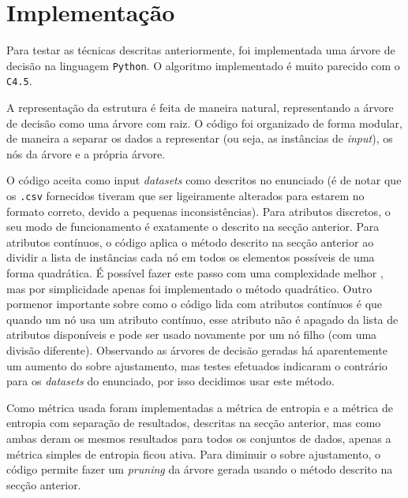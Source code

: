 \documentclass[12pt,a4paper,oneside]{article}
\begin{document}

\section{Implementação}
\label{sec:imp}

Para testar as técnicas descritas anteriormente, foi implementada uma
árvore de decisão na linguagem \texttt{Python}. O algoritmo
implementado é muito parecido com o \texttt{C4.5}.

A representação da estrutura é feita de maneira natural, representando
a árvore de decisão como uma árvore com raiz. O código foi organizado
de forma modular, de maneira a separar os dados a representar (ou
seja, as instâncias de \textit{input}), os nós da árvore e a própria
árvore.

O código aceita como input \textit{datasets} como descritos no
enunciado (é de notar que os \texttt{.csv} fornecidos tiveram que ser
ligeiramente alterados para estarem no formato correto, devido a
pequenas inconsistências). Para atributos discretos, o seu modo de
funcionamento é exatamente o descrito na secção anterior. Para
atributos contínuos, o código aplica o método descrito na secção
anterior ao dividir a lista de instâncias cada nó em todos os
elementos possíveis de uma forma quadrática. É possível fazer este
passo com uma complexidade melhor \cite{quinlan:1996}, mas por
simplicidade apenas foi implementado o método quadrático. Outro
pormenor importante sobre como o código lida com atributos contínuos é
que quando um nó usa um atributo contínuo, esse atributo não é apagado
da lista de atributos disponíveis e pode ser usado novamente por um nó
filho (com uma divisão diferente). Observando as árvores de decisão
geradas há aparentemente um aumento do sobre ajustamento, mas testes
efetuados indicaram o contrário para os \textit{datasets} do
enunciado, por isso decidimos usar este método.

Como métrica usada foram implementadas a métrica de entropia e a
métrica de entropia com separação de resultados, descritas na secção
anterior, mas como ambas deram os mesmos resultados para todos os
conjuntos de dados, apenas a métrica simples de entropia ficou
ativa. Para diminuir o sobre ajustamento, o código permite fazer um
\textit{pruning} da árvore gerada usando o método descrito na secção
anterior.
\end{document}
